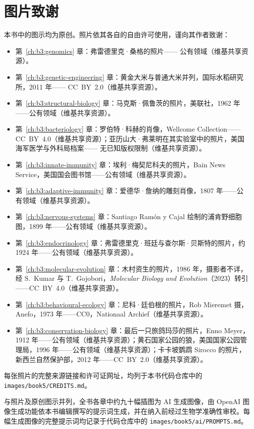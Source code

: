 \chapter*{图片致谢}

本书中的图示均为原创。照片依其各自的自由许可使用，谨向其作者致谢：

\begin{itemize}
  \item 第~\ref{ch:b3:genomics} 章：弗雷德里克·桑格的照片——
        公有领域（维基共享资源）。
  \item 第~\ref{ch:b3:genetic-engineering} 章：黄金大米与普通大米并列，国际水稻研究所，2011 年——
        CC~BY~2.0（维基共享资源）。
  \item 第~\ref{ch:b3:structural-biology} 章：马克斯·佩鲁茨的照片，美联社，1962 年——公有领域（维基共享资源）。
  \item 第~\ref{ch:b3:bacteriology} 章：罗伯特·科赫的肖像，Wellcome Collection——
        CC~BY~4.0（维基共享资源）；亚历山大·弗莱明在其实验室中的照片，美国海军医学与外科局档案——
        无已知版权限制（维基共享资源）。
  \item 第~\ref{ch:b3:innate-immunity} 章：埃利·梅契尼科夫的照片，Bain News Service，美国国会图书馆——公有领域（维基共享资源）。
  \item 第~\ref{ch:b3:adaptive-immunity} 章：爱德华·詹纳的雕刻肖像，1807 年——公有领域（维基共享资源）。
  \item 第~\ref{ch:b3:nervous-systems} 章：Santiago Ramón y Cajal 绘制的浦肯野细胞图，1899 年——公有领域（维基共享资源）。
  \item 第~\ref{ch:b3:endocrinology} 章：弗雷德里克·班廷与查尔斯·贝斯特的照片，约 1924 年——公有领域（维基共享资源）。
  \item 第~\ref{ch:b3:molecular-evolution} 章：木村资生的照片，1986 年，摄影者不详，经 S.~Kumar 与 T.~Gojobori，\emph{Molecular Biology and Evolution}（2023）转引——CC~BY~4.0（维基共享资源）。
  \item 第~\ref{ch:b3:behavioural-ecology} 章：尼科·廷伯根的照片，Rob Mieremet 摄，Anefo，1973 年——CC0，Nationaal Archief（维基共享资源）。
  \item 第~\ref{ch:b3:conservation-biology} 章：最后一只旅鸽玛莎的照片，Enno Meyer，1912 年——公有领域（维基共享资源）；黄石国家公园的狼，美国国家公园管理局，1996 年——公有领域（维基共享资源）；卡卡坡鹦鹉 Sirocco 的照片，新西兰自然保护部，2012 年——CC~BY~2.0（维基共享资源）。
\end{itemize}

每张照片的完整来源链接和许可证网址，均列于本书代码仓库中的 \texttt{images/book5/CREDITS.md}。

\bigskip
与照片及原创图示并列，全书各章中约九十幅插图为 AI 生成图像，由 OpenAI 图像生成功能依本书编辑撰写的提示词生成，并在纳入前经过生物学准确性审校。每幅生成图像的完整提示词均记录于代码仓库中的 \texttt{images/book5/ai/PROMPTS.md}。
\clearpage
